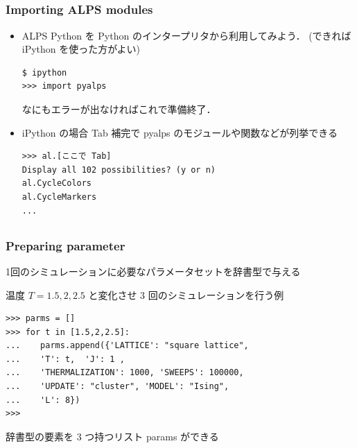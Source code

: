 \subsection*{\redm\whiteb\greenb}
\begin{frame}[t,fragile]
 \frametitle{Importing ALPS modules}

\begin{itemize}
 \item ALPS Python を Python のインタープリタから利用してみよう．
       (できれば iPython を使った方がよい)
       
\begin{lstlisting}
$ ipython
>>> import pyalps
\end{lstlisting}
       なにもエラーが出なければこれで準備終了．


 \item iPython の場合 Tab 補完で pyalps のモジュールや関数などが列挙できる

\begin{lstlisting}
>>> al.[ここで Tab]
Display all 102 possibilities? (y or n)
al.CycleColors   
al.CycleMarkers  
...            
\end{lstlisting}
\end{itemize}
\end{frame}

\subsection*{\redm\whiteb\greenb}
\begin{frame}[t,fragile]
\frametitle{Preparing parameter}

1回のシミュレーションに必要なパラメータセットを辞書型で与える


温度 $T = 1.5, 2, 2.5$ と変化させ 3 回のシミュレーションを行う例

\begin{lstlisting}
>>> parms = []
>>> for t in [1.5,2,2.5]:
...    parms.append({'LATTICE': "square lattice", 
...    'T': t,  'J': 1 ,
...    'THERMALIZATION': 1000, 'SWEEPS': 100000,
...    'UPDATE': "cluster", 'MODEL': "Ising",
...    'L': 8})
>>>
\end{lstlisting}

辞書型の要素を 3 つ持つリスト params ができる
\end{frame}

